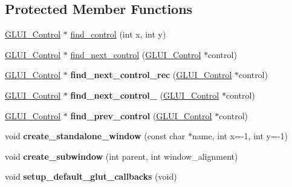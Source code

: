 \subsection*{Protected Member Functions}
\begin{DoxyCompactItemize}
\item 
\hyperlink{classGLUI__Control}{G\-L\-U\-I\-\_\-\-Control} $\ast$ \hyperlink{classGLUI__Main_ac4954c3b7790085da920a6f19c033843}{find\-\_\-control} (int x, int y)
\item 
\hyperlink{classGLUI__Control}{G\-L\-U\-I\-\_\-\-Control} $\ast$ \hyperlink{classGLUI__Main_ad1bf3a4ba72353d87315a57f12703bcd}{find\-\_\-next\-\_\-control} (\hyperlink{classGLUI__Control}{G\-L\-U\-I\-\_\-\-Control} $\ast$control)
\item 
\hypertarget{classGLUI__Main_a2c310ed285d93969a0cb132da882d2c6}{\hyperlink{classGLUI__Control}{G\-L\-U\-I\-\_\-\-Control} $\ast$ {\bfseries find\-\_\-next\-\_\-control\-\_\-rec} (\hyperlink{classGLUI__Control}{G\-L\-U\-I\-\_\-\-Control} $\ast$control)}\label{classGLUI__Main_a2c310ed285d93969a0cb132da882d2c6}

\item 
\hypertarget{classGLUI__Main_a5dc8a5cad780b8fe712c301b72e5c8aa}{\hyperlink{classGLUI__Control}{G\-L\-U\-I\-\_\-\-Control} $\ast$ {\bfseries find\-\_\-next\-\_\-control\-\_\-} (\hyperlink{classGLUI__Control}{G\-L\-U\-I\-\_\-\-Control} $\ast$control)}\label{classGLUI__Main_a5dc8a5cad780b8fe712c301b72e5c8aa}

\item 
\hypertarget{classGLUI__Main_a3e3529546ab8d4c358c2f425a11a6ca3}{\hyperlink{classGLUI__Control}{G\-L\-U\-I\-\_\-\-Control} $\ast$ {\bfseries find\-\_\-prev\-\_\-control} (\hyperlink{classGLUI__Control}{G\-L\-U\-I\-\_\-\-Control} $\ast$control)}\label{classGLUI__Main_a3e3529546ab8d4c358c2f425a11a6ca3}

\item 
\hypertarget{classGLUI__Main_a524a3d3e51e01707a6fe1916bfdd4e1f}{void {\bfseries create\-\_\-standalone\-\_\-window} (const char $\ast$name, int x=-\/1, int y=-\/1)}\label{classGLUI__Main_a524a3d3e51e01707a6fe1916bfdd4e1f}

\item 
\hypertarget{classGLUI__Main_a4a05365e245aa1751f5b828bdbd78b0e}{void {\bfseries create\-\_\-subwindow} (int parent, int window\-\_\-alignment)}\label{classGLUI__Main_a4a05365e245aa1751f5b828bdbd78b0e}

\item 
\hypertarget{classGLUI__Main_a375e803cc89e36548e73719479a8613a}{void {\bfseries setup\-\_\-default\-\_\-glut\-\_\-callbacks} (void)}\label{classGLUI__Main_a375e803cc89e36548e73719479a8613a}


\end{DoxyCompactItemize}
